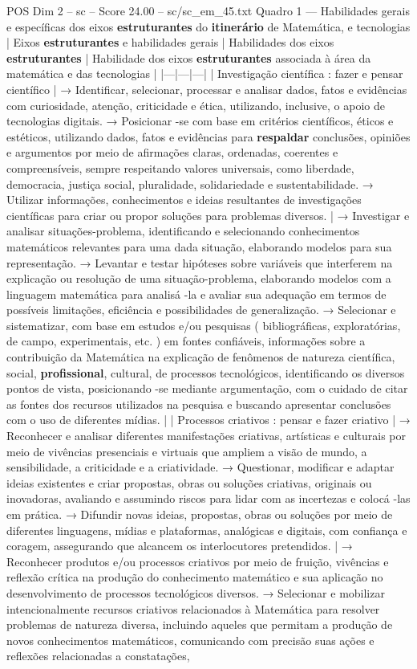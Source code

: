 \begin{textsample}{POS Dim 2 – sc – Score 24.00 – sc/sc\_em\_45.txt}
Quadro 1 — Habilidades gerais e específicas dos eixos \textbf{estruturantes} do \textbf{itinerário} de Matemática, e tecnologias | Eixos \textbf{estruturantes} e habilidades gerais | Habilidades dos eixos \textbf{estruturantes} | Habilidade dos eixos \textbf{estruturantes} associada à área da matemática e das tecnologias | |---|---|---| | Investigação científica : fazer e pensar científico | → Identificar, selecionar, processar e analisar dados, fatos e evidências com curiosidade, atenção, criticidade e ética, utilizando, inclusive, o apoio de tecnologias digitais. → Posicionar -se com base em critérios científicos, éticos e estéticos, utilizando dados, fatos e evidências para \textbf{respaldar} conclusões, opiniões e argumentos por meio de afirmações claras, ordenadas, coerentes e compreensíveis, sempre respeitando valores universais, como liberdade, democracia, justiça social, pluralidade, solidariedade e sustentabilidade. → Utilizar informações, conhecimentos e ideias resultantes de investigações científicas para criar ou propor soluções para problemas diversos. | → Investigar e analisar situações-problema, identificando e selecionando conhecimentos matemáticos relevantes para uma dada situação, elaborando modelos para sua representação. → Levantar e testar hipóteses sobre variáveis que interferem na explicação ou resolução de uma situação-problema, elaborando modelos com a linguagem matemática para analisá -la e avaliar sua adequação em termos de possíveis limitações, eficiência e possibilidades de generalização. → Selecionar e sistematizar, com base em estudos e/ou pesquisas ( bibliográficas, exploratórias, de campo, experimentais, etc. ) em fontes confiáveis, informações sobre a contribuição da Matemática na explicação de fenômenos de natureza científica, social, \textbf{profissional}, cultural, de processos tecnológicos, identificando os diversos pontos de vista, posicionando -se mediante argumentação, com o cuidado de citar as fontes dos recursos utilizados na pesquisa e buscando apresentar conclusões com o uso de diferentes mídias. | | Processos criativos : pensar e fazer criativo | → Reconhecer e analisar diferentes manifestações criativas, artísticas e culturais por meio de vivências presenciais e virtuais que ampliem a visão de mundo, a sensibilidade, a criticidade e a criatividade. → Questionar, modificar e adaptar ideias existentes e criar propostas, obras ou soluções criativas, originais ou inovadoras, avaliando e assumindo riscos para lidar com as incertezas e colocá -las em prática. → Difundir novas ideias, propostas, obras ou soluções por meio de diferentes linguagens, mídias e plataformas, analógicas e digitais, com confiança e coragem, assegurando que alcancem os interlocutores pretendidos. | → Reconhecer produtos e/ou processos criativos por meio de fruição, vivências e reflexão crítica na produção do conhecimento matemático e sua aplicação no desenvolvimento de processos tecnológicos diversos. → Selecionar e mobilizar intencionalmente recursos criativos relacionados à Matemática para resolver problemas de natureza diversa, incluindo aqueles que permitam a produção de novos conhecimentos matemáticos, comunicando com precisão suas ações e reflexões relacionadas a constatações, 
\end{textsample}
